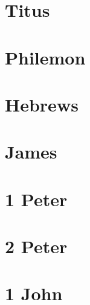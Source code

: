 \chapter{Titus}
\begin{multicols}{2}
  \raggedcolumns
  \parskip=0pt \relax
  
\end{multicols}

\chapter{Philemon}
\begin{multicols}{2}
  \raggedcolumns
  \parskip=0pt \relax
  
\end{multicols}

\chapter{Hebrews}
\begin{multicols}{2}
  \raggedcolumns
  \parskip=0pt \relax
  
\end{multicols}

\chapter{James}
\begin{multicols}{2}
  \raggedcolumns
  \parskip=0pt \relax
  
\end{multicols}

\chapter{1 Peter}
\begin{multicols}{2}
  \raggedcolumns
  \parskip=0pt \relax
  
\end{multicols}

\chapter{2 Peter}
\begin{multicols}{2}
  \raggedcolumns
  \parskip=0pt \relax
  
\end{multicols}

\chapter{1 John}
\begin{multicols}{2}
  \raggedcolumns
  \parskip=0pt \relax
  
\end{multicols}

